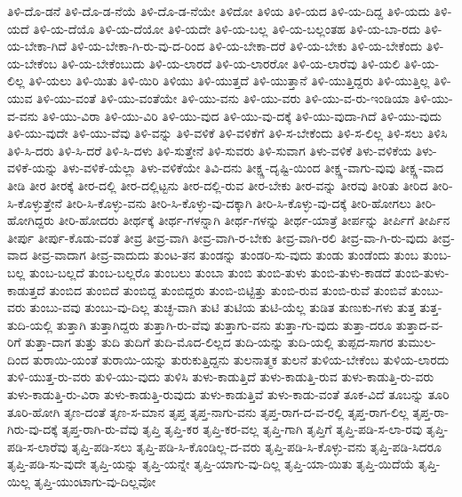 {ತಿಳಿ-ದೊ-ಡನೆ
ತಿಳಿ-ದೊ-ಡ-ನೆಯೆ
ತಿಳಿ-ದೊ-ಡ-ನೆಯೇ
ತಿಳಿದೋ
ತಿಳಿಯ
ತಿಳಿ-ಯದ
ತಿಳಿ-ಯ-ದಿದ್ದ
ತಿಳಿ-ಯದು
ತಿಳಿ-ಯದೆ
ತಿಳಿ-ಯ-ದೆಯೊ
ತಿಳಿ-ಯ-ದೆಯೋ
ತಿಳಿ-ಯದೇ
ತಿಳಿ-ಯ-ಬಲ್ಲ
ತಿಳಿ-ಯ-ಬಲ್ಲಂತಹ
ತಿಳಿ-ಯ-ಬಾ-ರದು
ತಿಳಿ-ಯ-ಬೇಕಾ-ಗಿದೆ
ತಿಳಿ-ಯ-ಬೇಕಾ-ಗಿ-ರು-ವು-ದ-ರಿಂದ
ತಿಳಿ-ಯ-ಬೇಕಾ-ದರೆ
ತಿಳಿ-ಯ-ಬೇಕು
ತಿಳಿ-ಯ-ಬೇಕೆಂದು
ತಿಳಿ-ಯ-ಬೇಕೆಂಬ
ತಿಳಿ-ಯ-ಬೇಕೆಂಬುದು
ತಿಳಿ-ಯ-ಲಾರದೆ
ತಿಳಿ-ಯ-ಲಾರರೋ
ತಿಳಿ-ಯ-ಲಾರೆವು
ತಿಳಿ-ಯಲಿ
ತಿಳಿ-ಯ-ಲಿಲ್ಲ
ತಿಳಿ-ಯಲು
ತಿಳಿ-ಯಿತು
ತಿಳಿ-ಯಿರಿ
ತಿಳಿಯು
ತಿಳಿ-ಯುತ್ತದೆ
ತಿಳಿ-ಯುತ್ತಾನೆ
ತಿಳಿ-ಯುತ್ತಿದ್ದರು
ತಿಳಿ-ಯುತ್ತಿಲ್ಲ
ತಿಳಿ-ಯುವ
ತಿಳಿ-ಯು-ವಂತೆ
ತಿಳಿ-ಯು-ವಂತೆಯೇ
ತಿಳಿ-ಯು-ವನು
ತಿಳಿ-ಯು-ವರು
ತಿಳಿ-ಯು-ವ-ರು-ಇಂಡಿಯಾ
ತಿಳಿ-ಯು-ವ-ವನು
ತಿಳಿ-ಯು-ವಿರಾ
ತಿಳಿ-ಯು-ವಿರಿ
ತಿಳಿ-ಯು-ವುದ
ತಿಳಿ-ಯು-ವು-ದಕ್ಕೆ
ತಿಳಿ-ಯು-ವುದಾ-ಗಿದೆ
ತಿಳಿ-ಯು-ವುದು
ತಿಳಿ-ಯು-ವುದೇ
ತಿಳಿ-ಯು-ವೆವು
ತಿಳಿ-ವನ್ನು
ತಿಳಿ-ವಳಿಕೆ
ತಿಳಿ-ವಳಿಕೆಗೆ
ತಿಳಿ-ಸ-ಬೇಕೆಂದು
ತಿಳಿ-ಸ-ಲಿಲ್ಲ
ತಿಳಿ-ಸಲು
ತಿಳಿಸಿ
ತಿಳಿ-ಸಿ-ದರು
ತಿಳಿ-ಸಿ-ದರೆ
ತಿಳಿ-ಸಿ-ದಳು
ತಿಳಿ-ಸುತ್ತೇನೆ
ತಿಳಿ-ಸುವರು
ತಿಳಿ-ಸುವಾಗ
ತಿಳು-ವಳಿಕೆ
ತಿಳು-ವಳಿಕೆಯ
ತಿಳು-ವಳಿಕೆ-ಯನ್ನು
ತಿಳು-ವಳಿಕೆ-ಯೆಲ್ಲಾ
ತಿಳು-ವಳಿಕೆಯೇ
ತಿವಿ-ದನು
ತೀಕ್ಷ್ಣ-ದೃಷ್ಟಿ-ಯಿಂದ
ತೀಕ್ಷ್ಣ-ವಾಗು-ವುವು
ತೀಕ್ಷ್ಣ-ವಾದ
ತೀಡಿ
ತೀರ
ತೀರಕ್ಕೆ
ತೀರ-ದಲ್ಲಿ
ತೀರ-ದಲ್ಲಿಟ್ಟನು
ತೀರ-ದಲ್ಲಿ-ರುವ
ತೀರ-ಬೇಕು
ತೀರ-ವನ್ನು
ತೀರವು
ತೀರಿತು
ತೀರಿದ
ತೀರಿ-ಸಿ-ಕೊಳ್ಳುತ್ತೇನೆ
ತೀರಿ-ಸಿ-ಕೊಳ್ಳು-ವನು
ತೀರಿ-ಸಿ-ಕೊಳ್ಳು-ವು-ದಕ್ಕಾಗಿ
ತೀರಿ-ಸಿ-ಕೊಳ್ಳು-ವು-ದಕ್ಕೆ
ತೀರಿ-ಹೋಗಲು
ತೀರಿ-ಹೋಗಿದ್ದರು
ತೀರಿ-ಹೋದರು
ತೀರ್ಥಕ್ಕೆ
ತೀರ್ಥ-ಗಳನ್ನಾಗಿ
ತೀರ್ಥ-ಗಳನ್ನು
ತೀರ್ಥ-ಯಾತ್ರೆ
ತೀರ್ಪನ್ನು
ತೀರ್ಪಿಗೆ
ತೀರ್ಪಿನ
ತೀರ್ಪು
ತೀರ್ಪು-ಕೊಡು-ವಂತೆ
ತೀವ್ರ
ತೀವ್ರ-ವಾಗಿ
ತೀವ್ರ-ವಾಗಿ-ರ-ಬೇಕು
ತೀವ್ರ-ವಾಗಿ-ರಲಿ
ತೀವ್ರ-ವಾ-ಗಿ-ರು-ವುದು
ತೀವ್ರ-ವಾದ
ತೀವ್ರ-ವಾದಾಗ
ತೀವ್ರ-ವಾದುದು
ತುಂಟ-ತನ
ತುಂಡನ್ನು
ತುಂಡರಿ-ಸು-ವುದು
ತುಂಡು
ತುಂಡೆಂದು
ತುಂಬ
ತುಂಬ-ಬಲ್ಲ
ತುಂಬ-ಬಲ್ಲದೆ
ತುಂಬ-ಬಲ್ಲರೊ
ತುಂಬಲು
ತುಂಬಾ
ತುಂಬಿ
ತುಂಬಿ-ತುಳು
ತುಂಬಿ-ತುಳು-ಕಾಡದೆ
ತುಂಬಿ-ತುಳು-ಕಾಡುತ್ತದೆ
ತುಂಬಿದ
ತುಂಬಿದೆ
ತುಂಬಿದ್ದ
ತುಂಬಿದ್ದರು
ತುಂಬಿ-ಬಿಟ್ಟಿತ್ತು
ತುಂಬಿ-ರುವ
ತುಂಬಿ-ರುವೆ
ತುಂಬಿವೆ
ತುಂಬು-ವರು
ತುಂಬು-ವವು
ತುಂಬು-ವು-ದಿಲ್ಲ
ತುಚ್ಛ-ವಾಗಿ
ತುಟಿ
ತುಟಿಯ
ತುಟಿ-ಯೆಲ್ಲ
ತುಡಿತ
ತುಣುಕು-ಗಳು
ತುತ್ತ
ತುತ್ತ-ತುದಿ-ಯಲ್ಲಿ
ತುತ್ತಾಗಿ
ತುತ್ತಾಗಿದ್ದರು
ತುತ್ತಾಗಿ-ರು-ವೆವು
ತುತ್ತಾಗು-ವನು
ತುತ್ತಾ-ಗು-ವುದು
ತುತ್ತಾ-ದರೂ
ತುತ್ತಾದ-ವ-ರಿಗೆ
ತುತ್ತಾ-ದಾಗ
ತುತ್ತು
ತುದಿ
ತುದಿಗೆ
ತುದಿ-ಮೊದ-ಲಿಲ್ಲದ
ತುದಿ-ಯನ್ನು
ತುದಿ-ಯಲ್ಲಿ
ತುಪ್ಪದ-ಸಾಗರ
ತುಮುಲ-ದಿಂದ
ತುರಾಯಿ-ಯಂತೆ
ತುರಾಯಿ-ಯನ್ನು
ತುರುಕುತ್ತಿದ್ದನು
ತುಲನಾತ್ಮಕ
ತುಲನೆ
ತುಳಿಯ-ಬೇಕೆಂಬ
ತುಳಿಯ-ಲಾರದು
ತುಳಿ-ಯುತ್ತ-ರು-ವರು
ತುಳಿ-ಯು-ವುದು
ತುಳಿಸಿ
ತುಳು-ಕಾಡುತ್ತಿದೆ
ತುಳು-ಕಾಡುತ್ತಿ-ರುವ
ತುಳು-ಕಾಡುತ್ತಿ-ರು-ವರು
ತುಳು-ಕಾಡುತ್ತಿ-ರು-ವಿರಾ
ತುಳು-ಕಾಡುತ್ತಿ-ರುವುದು
ತುಳು-ಕಾಡುತ್ತಿವೆ
ತುಳು-ಕಾಡು-ವಂತೆ
ತೂಕ-ವಿದೆ
ತೂಬನ್ನು
ತೂರಿ
ತೂರಿ-ಹೋಗಿ
ತೃಣ-ದಂತೆ
ತೃಣ-ಸ-ಮಾನ
ತೃಪ್ತ
ತೃಪ್ತ-ನಾಗು-ವನು
ತೃಪ್ತ-ರಾಗ-ದ-ವ-ರಲ್ಲಿ
ತೃಪ್ತ-ರಾಗ-ಲಿಲ್ಲ
ತೃಪ್ತ-ರಾ-ಗಿರು-ವು-ದಕ್ಕೆ
ತೃಪ್ತ-ರಾಗಿ-ರು-ವೆವು
ತೃಪ್ತಿ
ತೃಪ್ತಿ-ಕರ
ತೃಪ್ತಿ-ಕರ-ವಲ್ಲ
ತೃಪ್ತಿ-ಗಾಗಿ
ತೃಪ್ತಿಗೆ
ತೃಪ್ತಿ-ಪಡಿ-ಸ-ಲಾ-ರವು
ತೃಪ್ತಿ-ಪಡಿ-ಸ-ಲಾರೆವು
ತೃಪ್ತಿ-ಪಡಿ-ಸಲು
ತೃಪ್ತಿ-ಪಡಿ-ಸಿ-ಕೊಂಡಿಲ್ಲ-ದ-ವರು
ತೃಪ್ತಿ-ಪಡಿ-ಸಿ-ಕೊಳ್ಳು-ವನು
ತೃಪ್ತಿ-ಪಡಿ-ಸಿದರೂ
ತೃಪ್ತಿ-ಪಡಿ-ಸು-ವುದೇ
ತೃಪ್ತಿ-ಯನ್ನು
ತೃಪ್ತಿ-ಯನ್ನೇ
ತೃಪ್ತಿ-ಯಾಗು-ವು-ದಿಲ್ಲ
ತೃಪ್ತಿ-ಯಾ-ಯಿತು
ತೃಪ್ತಿ-ಯಿದೆಯೆ
ತೃಪ್ತಿ-ಯಿಲ್ಲ
ತೃಪ್ತಿ-ಯುಂಟಾಗು-ವು-ದಿಲ್ಲವೋ
}
